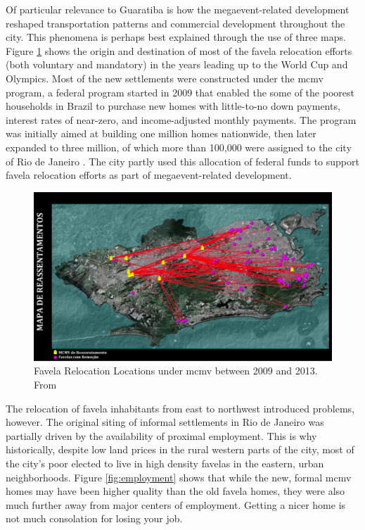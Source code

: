Of particular relevance to Guaratiba is how the megaevent-related development reshaped transportation patterns and commercial development throughout the city. This phenomena is perhaps best explained through the use of three maps. Figure \ref{fig:relocation} shows the origin and destination of most of the favela relocation efforts (both voluntary and mandatory) in the years leading up to the World Cup and Olympics. Most of the new settlements were constructed under the \ac{mcmv} program, a federal program started in 2009 that enabled the some of the poorest households in Brazil to purchase new homes with little-to-no down payments, interest rates of near-zero, and income-adjusted monthly payments. The program was initially aimed at building one million homes nationwide, then later expanded to three million, of which more than 100,000 were assigned to the city of Rio de Janeiro \cite{nadalMinhaCasaMinha2018}. The city partly used this allocation of federal funds to support favela relocation efforts as part of megaevent-related development.

\begin{figure}[h]
	\centering
	\includegraphics[scale=0.3]{Figures/chap4/Relocation.png}
	\caption[Favela Relocation Locations under MCMV between 2009 and 2013]{Favela Relocation Locations under \ac{mcmv} between 2009 and 2013. From \cite{faulhaberRioMaravilhaProjetos2012}}
	\label{fig:relocation}
\end{figure}

The relocation of favela inhabitants from east to northwest introduced problems, however. The original siting of informal settlements in Rio de Janeiro was partially driven by the availability of proximal employment. This is why historically, despite low land prices in the rural western parts of the city, most of the city's poor elected to live in high density favelas in the eastern, urban neighborhoods. Figure \ref{fig:employment} shows that while the new, formal \ac{mcmv} homes may have been higher quality than the old favela homes, they were also much further away from major centers of employment. Getting a nicer home is not much consolation for losing your job. 


